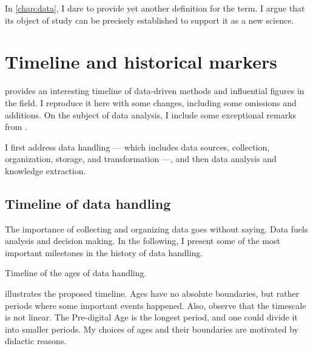 In \cref{chap:data}, I dare to provide yet another definition for the term.  I
argue that its object of study can be precisely established to support it as a new
science.

\section{Timeline and historical markers}

\textcite{Kelleher2018} provides an interesting timeline of data-driven methods and
influential figures in the field.  I reproduce it here with some changes, including
some omissions and additions.  On the subject of data analysis, I include some
exceptional remarks
from \textcite{Vapnik1999b}.

I first address data handling --- which includes data sources, collection, organization,
storage, and transformation ---, and then data analysis and knowledge extraction.

\subsection{Timeline of data handling}
\label{sub:time-handling}

The importance of collecting and organizing data goes without saying.  Data fuels analysis and
decision making.  In the following, I present some of the most important milestones in the history
of data handling.

\begin{figurebox}[label=fig:data-handling-history]{Timeline of the ages of data handling.}
  \centering
\end{figurebox}

 illustrates the proposed timeline.  Ages have no absolute
boundaries, but rather periods where some important events happened.  Also, observe that
the timescale is not linear.  The Pre-digital Age is the longest period, and one could
divide it into smaller periods.  My choices of ages and their boundaries are motivated by
didactic reasons.

